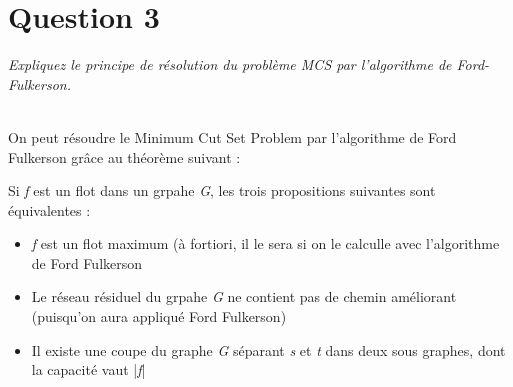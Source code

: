 \section{Question 3}
\textit{Expliquez le principe de résolution du problème MCS par l'algorithme de Ford-Fulkerson.}\\~\\\par
On peut résoudre le Minimum Cut Set Problem par l'algorithme de Ford Fulkerson grâce au théorème suivant :\\\par
Si \textit{f} est un flot dans un grpahe \textit{G}, les trois propositions suivantes sont équivalentes :\\
\begin{itemize}
 \item \textit{f} est un flot maximum (à fortiori, il le sera si on le calculle avec l'algorithme de Ford Fulkerson
 \item Le réseau résiduel du grpahe \textit{G} ne contient pas de chemin améliorant (puisqu'on aura appliqué Ford Fulkerson)
 \item Il existe une coupe du graphe \textit{G} séparant \textit{s} et \textit{t} dans deux sous graphes, dont la capacité vaut |\textit{f}|
\end{itemize}

